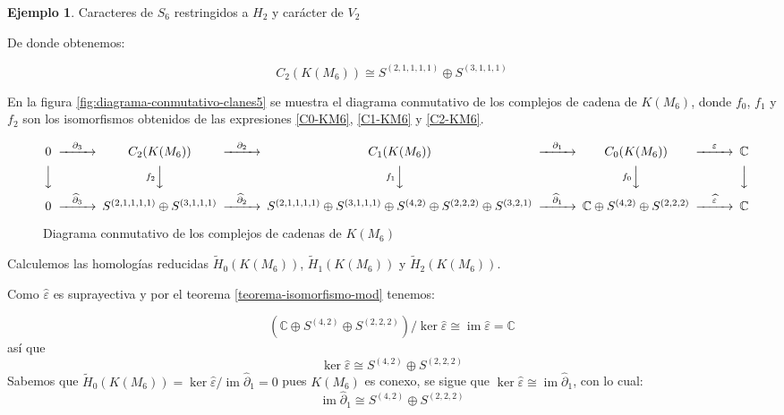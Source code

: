 \documentclass[12pt]{book}
\theoremstyle{definition}
\newtheorem{example}[theorem]{Ejemplo}
\DeclareMathOperator{\im}{im}
\newcounter{in}
\begin{document}
\begin{example}
\begin{table}[!hbtp]
\caption{Caracteres de $S_{6}$ restringidos a $H_{2}$ y carácter de $V_{2}$}
\label{tab:clanes-H_2-6}
\end{table}

De donde obtenemos:

\begin{equation}
  C_{2}(K(M_{6}))\cong S^{(2,1,1,1,1)}\oplus S^{(3,1,1,1)}
  \label{C2-KM6}
\end{equation}

En la figura \ref{fig:diagrama-conmutativo-clanes5} se muestra el diagrama
conmutativo de los complejos de cadena de $K(M_{6})$, donde $f_{0}$,
$f_{1}$ y $f_{2}$ son los isomorfismos obtenidos de las expresiones
\ref{C0-KM6}, \ref{C1-KM6} y \ref{C2-KM6}.

\begin{sidewaysfigure}%
  {\small
    \[
    \begin{CD}
      0 @>{\partial_{3}}>> C_{2}(K(M_{6})) @>{\partial_{2}}>> C_{1}(K(M_{6})) @>{\partial_{1}}>> C_{0}(K(M_{6})) @>{\varepsilon}>> \mathbb{C}\\
      @VVV   @Vf_{2}VV   @Vf_{1}VV   @Vf_{0}VV   @VVV    \\
      0  @>{\widehat\partial_{3}}>> S^{(2,1,1,1,1)}\oplus S^{(3,1,1,1)} @>{\widehat\partial_{2}}>>
      S^{(2,1,1,1,1)}\oplus S^{(3,1,1,1)}\oplus S^{(4,2)}\oplus
      S^{(2,2,2)}\oplus S^{(3,2,1)} @>{\widehat\partial_{1}}>>
      \mathbb{C} \oplus S^{(4,2)}\oplus S^{(2,2,2)} @>{\widehat
        \varepsilon}>> \mathbb{C}
    \end{CD}
    \]
  }
  
  \caption{Diagrama conmutativo de los complejos de cadenas de $K(M_{6})$}
  \label{fig:diagrama-conmutativo-clanes6}
\end{sidewaysfigure}

Calculemos las homologías reducidas $\widetilde H_{0}(K(M_{6}))$,
$\widetilde H_{1}(K(M_{6}))$ y $\widetilde H_{2}(K(M_{6}))$.

Como $\widehat\varepsilon$ es suprayectiva y por el teorema
\ref{teorema-isomorfismo-mod} tenemos:



\begin{equation*}
  (\mathbb{C} \oplus S^{(4,2)}\oplus S^{(2,2,2)})/\ker\widehat\varepsilon\cong \im \widehat\varepsilon=\mathbb{C}
\end{equation*}
así que
\begin{equation*}
  \label{ker0-KM6}
  \ker\widehat\varepsilon\cong S^{(4,2)}\oplus S^{(2,2,2)}
\end{equation*}
Sabemos que $\widetilde H_{0}(K(M_{6}))=\ker \widehat\varepsilon/\im
\widehat\partial_{1}=0$ pues $K(M_{6})$ es conexo, se sigue que $\ker \widehat\varepsilon\cong
\im\widehat\partial_{1}$, con lo cual:
\begin{equation}
  \label{im1-KM6}
  \im \widehat\partial_{1}\cong S^{(4,2)}\oplus S^{(2,2,2)}
\end{equation}


\end{example}
\end{document}
